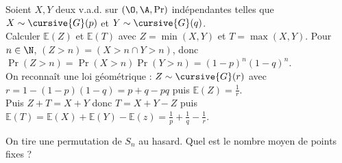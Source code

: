 \documentclass[11pt]{article}
\renewcommand*{\E}{\mathbb{E}}
\begin{document}
\begin{exercice}{}{}
    Soient $X,Y$ deux v.a.d. sur $(\O,\A,\Pr)$ indépendantes telles que $X\sim\cursive{G}(p)$ et $Y\sim\cursive{G}(q)$.\\
    Calculer $\E(Z)$ et $\E(T)$ avec $Z=\min(X,Y)$ et $T=\max(X,Y)$.
    \tcblower
    Pour $n\in\N$, $(Z>n)=(X>n \cap Y > n)$, donc $\Pr(Z>n)=\Pr(X>n)\Pr(Y>n)=(1-p)^n(1-q)^n$.\\
    On reconnaît une loi géométrique : $Z\sim\cursive{G}(r)$ avec $r=1-(1-p)(1-q)=p+q-pq$ puis $\E(Z)=\frac{1}{r}$.\\
    Puis $Z+T=X+Y$ donc $T=X+Y-Z$ puis $\E(T)=\E(X)+\E(Y)-\E(z)=\frac{1}{p}+\frac{1}{q}-\frac{1}{r}$.
\end{exercice}

\begin{exercice}{}{}
    On tire une permutation de $S_n$ au hasard. Quel est le nombre moyen de points fixes ?
\end{exercice}
\end{document}
